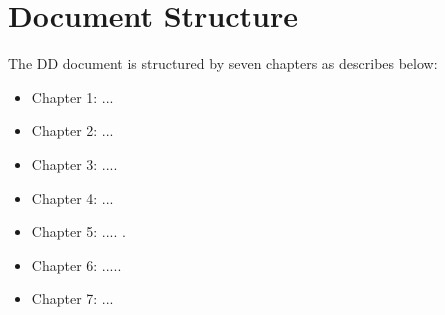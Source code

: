 \section{Document Structure}
The DD document is structured by seven chapters as describes below:\\

\begin{itemize}
	\item Chapter 1: ...
	\item Chapter 2: ...
	\item Chapter 3: ....
	\item Chapter 4: ...
	\item Chapter 5: .... .
	\item Chapter 6: .....
	\item Chapter 7: ...
\end{itemize}